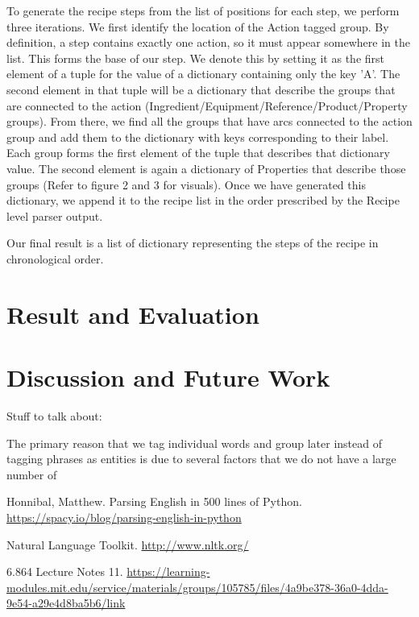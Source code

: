 To generate the recipe steps from the list of positions for each step, we perform three iterations. We first identify the location of the Action tagged group. By definition, a step contains exactly one action, so it must appear somewhere in the list. This forms the base of our step. We denote this by setting it as the first element of a tuple for the value of a dictionary containing only the key 'A'. The second element in that tuple will be a dictionary that describe the groups that are connected to the action (Ingredient/Equipment/Reference/Product/Property groups). From there, we find all the groups that have arcs connected to the action group and add them to the dictionary with keys corresponding to their label. Each group forms the first element of the tuple that describes that dictionary value. The second element is again a dictionary of Properties that describe those groups (Refer to figure 2 and 3 for visuals). Once we have generated this dictionary, we append it to the recipe list in the order prescribed by the Recipe level parser output.

Our final result is a list of dictionary representing the steps of the recipe in chronological order. 

\section{Result and Evaluation}

\section{Discussion and Future Work}

Stuff to talk about: 


The primary reason that we tag individual words and group later instead of tagging phrases as entities is due to several factors that we do not have a large number of 


\begin{thebibliography}{8}
Honnibal, Matthew. Parsing English in 500 lines of Python.
\href{https://spacy.io/blog/parsing-english-in-python}{https://spacy.io/blog/parsing-english-in-python}

Natural Language Toolkit.
\href{http://www.nltk.org/}{http://www.nltk.org/}

6.864 Lecture Notes 11. 
\href{https://learning-modules.mit.edu/service/materials/groups/105785/files/4a9be378-36a0-4dda-9e54-a29e4d8ba5b6/link}{https://learning-modules.mit.edu/service/materials/groups/105785/files/4a9be378-36a0-4dda-9e54-a29e4d8ba5b6/link}

\end{thebibliography}


